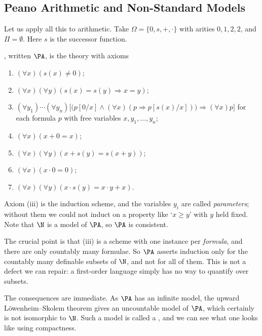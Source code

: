 \subsection{Peano Arithmetic and Non-Standard Models}

Let us apply all this to arithmetic. Take $\Omega = \{0, s, +, \cdot\}$ with arities $0, 1, 2, 2$, and $\Pi = \emptyset$. Here $s$ is the successor function.

\begin{definition}
  , written $\PA$, is the theory with axioms
  \begin{enumerate}[label=(\roman*)]
    \item $(\forall x)(s(x) \neq 0)$;
    \item $(\forall x)(\forall y)(s(x) = s(y) \Rightarrow x = y)$;
    \item $(\forall y_1)\cdots(\forall y_n)\bigl[\bigl(p[0/x] \land (\forall x)(p \Rightarrow p[s(x)/x])\bigr) \Rightarrow (\forall x)p\bigr]$ for each formula $p$ with free variables $x, y_1, \dots, y_n$;
    \item $(\forall x)(x + 0 = x)$;
    \item $(\forall x)(\forall y)(x + s(y) = s(x + y))$;
    \item $(\forall x)(x \cdot 0 = 0)$;
    \item $(\forall x)(\forall y)(x \cdot s(y) = x \cdot y + x)$.
  \end{enumerate}
\end{definition}

Axiom (iii) is the induction scheme, and the variables $y_i$ are called \emph{parameters}; without them we could not induct on a property like `$x \geq y$' with $y$ held fixed. Note that $\N$ is a model of $\PA$, so $\PA$ is consistent.

The crucial point is that (iii) is a scheme with one instance per \emph{formula}, and there are only countably many formulae. So $\PA$ asserts induction only for the countably many definable subsets of $\N$, and not for all of them. This is not a defect we can repair: a first-order language simply has no way to quantify over subsets.

The consequences are immediate. As $\PA$ has an infinite model, the upward L\"owenheim--Skolem theorem gives an uncountable model of $\PA$, which certainly is not isomorphic to $\N$. Such a model is called a , and we can see what one looks like using compactness.


